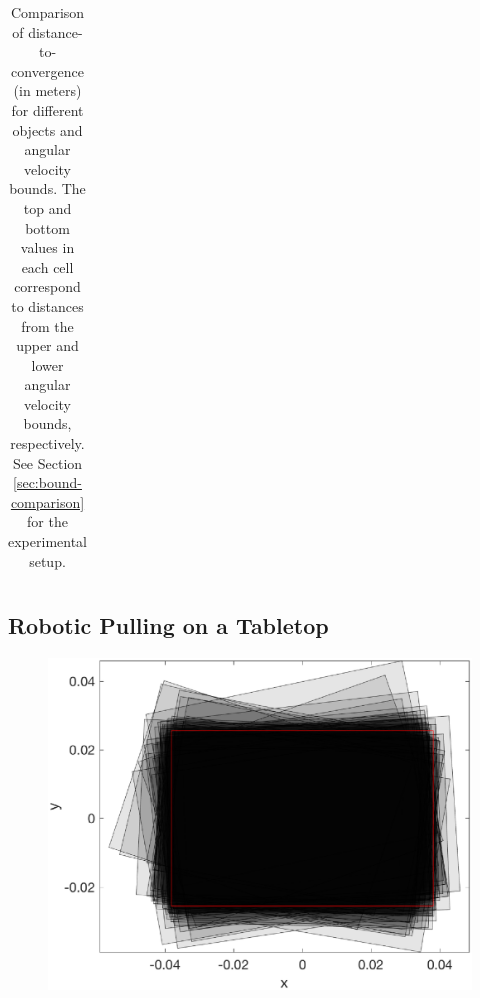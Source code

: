 \documentclass[conference]{IEEEtran}
\begin{document}
\begin{table}
\begin{center}
\begin{tabular}[c]{cccc}
        \bottomrule
      \end{tabular}
  \end{center}
  \caption{Comparison of distance-to-convergence (in meters) for different objects and angular velocity bounds. The top and bottom values in each cell correspond to distances from the upper and lower angular velocity bounds, respectively. See Section \ref{sec:bound-comparison} for the experimental setup.}
  \label{table:convergence-distance}
\end{table}

\subsection{Robotic Pulling on a Tabletop}
\begin{figure}
\begin{center}
  \includegraphics[width=\columnwidth]{fig/superimposed.eps}
\end{center}
\caption{}
\label{fig:}
\end{figure}
\end{document}
